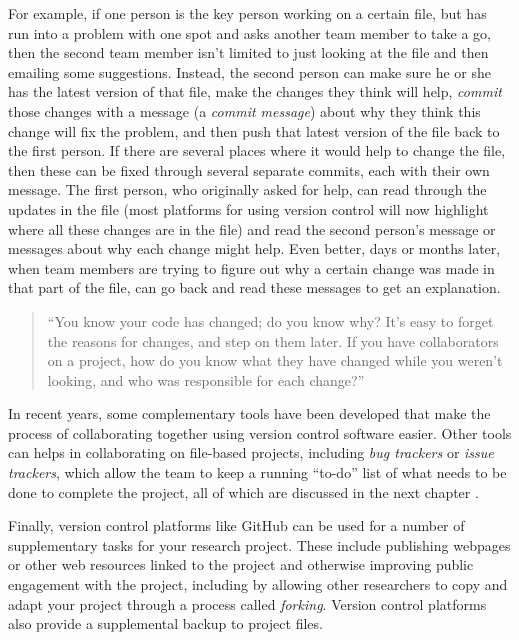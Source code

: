 \documentclass[]{tufte-book}
\begin{document}
For example, if one person is the key person working on a certain file,
but has run into a problem with one spot and asks another team member to take a
go, then the second team member isn't limited to just looking at the file and
then emailing some suggestions. Instead, the second person can make sure he or
she has the latest version of that file, make the changes they think will help,
\emph{commit} those changes with a message (a \emph{commit message}) about why they think
this change will fix the problem, and then push that latest version of the file
back to the first person. If there are several places where it would help to
change the file, then these can be fixed through several separate commits, each
with their own message. The first person, who originally asked for help, can
read through the updates in the file (most platforms for using version control
will now highlight where all these changes are in the file) and read the second
person's message or messages about why each change might help. Even better, days
or months later, when team members are trying to figure out why a certain change
was made in that part of the file, can go back and read these messages to get an
explanation.

\begin{quote}
``You know your code has changed; do you know why? It's easy to forget the
reasons for changes, and step on them later. If you have collaborators on a
project, how do you know what they have changed while you weren't looking, and
who was responsible for each change?'' \citep{raymond2003art}
\end{quote}

In recent years, some complementary tools have been developed that make the
process of collaborating together using version control software easier. Other
tools can helps in collaborating on file-based projects, including \emph{bug
trackers} or \emph{issue trackers}, which allow the team to keep a running ``to-do''
list of what needs to be done to complete the project, all of which are
discussed in the next chapter \citep{perez2016ten}.

Finally, version control platforms like GitHub can be used for a number
of supplementary tasks for your research project. These include publishing
webpages or other web resources linked to the project and otherwise improving
public engagement with the project, including by allowing other researchers
to copy and adapt your project through a process called \emph{forking}. Version
control platforms also provide a supplemental backup to project files.
\end{document}
